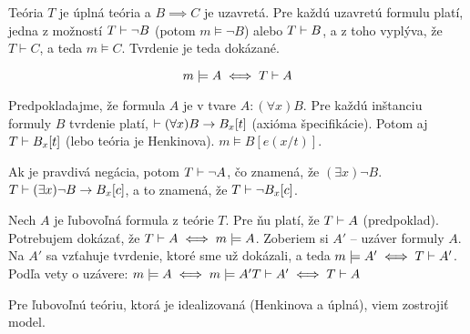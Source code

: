 Teória $T$ je úplná teória a $B \implies C$ je uzavretá. Pre každú uzavretú
formulu platí, jedna z možností $T \vdash \neg B$ (potom $m \models \neg B$)
alebo $T \vdash B$, a z toho vyplýva, že $T \vdash C$, a teda $m \models C$.
Tvrdenie je teda dokázané.

\begin{equation}
    m \models A \iff T \vdash A
\end{equation}

\par Predpokladajme, že formula $A$ je v tvare $A: (\forall x) B$. Pre každú
inštanciu formuly $B$ tvrdenie platí, $\vdash (\forall x) B \rightarrow B_x[t]$
(axióma špecifikácie). Potom aj $T \vdash B_x[t]$ (lebo teória je Henkinova). $m \models B[e(x/t)]$.

\par Ak je pravdivá negácia, potom $T \vdash \neg A$, čo znamená, že $(\exists
x) \neg B$. $T \vdash (\exists x) \neg B \rightarrow B_x[c]$, a to znamená, že $T
\vdash \neg B_x[c]$.

\par Nech $A$ je ľubovoľná formula z teórie $T$. Pre ňu platí, že $T \vdash A$
(predpoklad). Potrebujem dokázať, že $T \vdash A \iff m \models A$. Zoberiem si
$A'$ -- uzáver formuly $A$. Na $A'$ sa vzťahuje tvrdenie, ktoré sme už dokázali,
a teda $m \models A' \iff T \vdash A'$. Podľa vety o uzávere:
$m \models A \iff  m\models A' T \vdash A' \iff T \vdash A$

\par Pre ľubovoľnú teóriu, ktorá je idealizovaná (Henkinova a úplná), viem
zostrojiť model.

\stopFIXME
